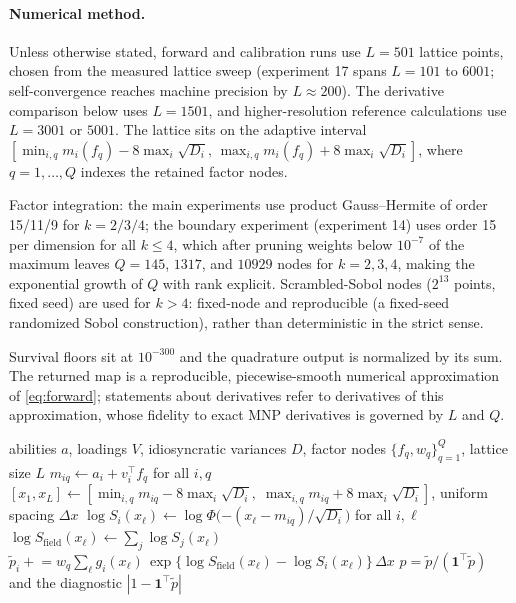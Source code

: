 \documentclass[12pt]{article}
\theoremstyle{remark}
\begin{document}
\paragraph{Numerical method.} Unless otherwise stated, forward and
calibration runs use $L = 501$ lattice points, chosen from the measured
lattice sweep (experiment 17 spans $L = 101$ to $6001$;
self-convergence reaches machine precision by $L \approx 200$). The
derivative comparison below uses $L = 1501$, and higher-resolution
reference calculations use $L = 3001$ or $5001$. The lattice sits on
the adaptive interval
$[\min_{i,q} m_i(f_q) - 8\max_i\sqrt{D_i},\,
\max_{i,q} m_i(f_q) + 8\max_i\sqrt{D_i}]$, where $q = 1, \dots, Q$ indexes
the retained factor nodes.

Factor integration: the main experiments use product
Gauss--Hermite of order 15/11/9 for $k = 2/3/4$; the boundary experiment
(experiment 14) uses order 15 per dimension for all $k \le 4$, which after
pruning weights below $10^{-7}$ of the maximum leaves $Q = 145$, $1317$, and
$10929$ nodes for $k = 2, 3, 4$, making the exponential growth of $Q$
with rank explicit. Scrambled-Sobol nodes ($2^{13}$ points, fixed seed) are used
for $k > 4$: fixed-node and reproducible (a fixed-seed randomized Sobol
construction), rather than deterministic in the strict sense.

Survival floors sit at $10^{-300}$ and the quadrature output is normalized by
its sum. The returned map is a reproducible, piecewise-smooth numerical
approximation of \eqref{eq:forward}; statements about derivatives refer to
derivatives of this approximation, whose fidelity to exact MNP derivatives is
governed by $L$ and $Q$.

\begin{algorithm}[H]
\caption{All-share forward pass (min-wins; reflected from argmax by $a = -\mu$)}
\label{alg:forward}
\begin{algorithmic}[1]
\Require abilities $a$, loadings $V$, idiosyncratic variances $D$, factor
nodes $\{f_q, w_q\}_{q=1}^{Q}$, lattice size $L$
\State $m_{iq} \gets a_i + v_i^\top f_q$ for all $i, q$
\State $[x_1, x_L] \gets [\min_{i,q} m_{iq} - 8\max_i \sqrt{D_i},\;
\max_{i,q} m_{iq} + 8\max_i \sqrt{D_i}]$, uniform spacing $\Delta x$
  \State $\log S_i(x_\ell) \gets \log\Phi\big({-(x_\ell -
  m_{iq})}/{\sqrt{D_i}}\big)$ for all $i, \ell$
  \State $\log S_{\mathrm{field}}(x_\ell) \gets \sum_j \log
  S_j(x_\ell)$
  \State $\tilde p_i \mathrel{+}= w_q \sum_\ell g_i(x_\ell)\,
  \exp\{\log S_{\mathrm{field}}(x_\ell) - \log S_i(x_\ell)\}\,
  \Delta x$ 
\EndFor
\State \Return $p = \tilde p / (\mathbf{1}^\top \tilde p)$ and the
diagnostic $|1 - \mathbf{1}^\top \tilde p|$
\end{algorithmic}
\end{algorithm}
\end{document}
